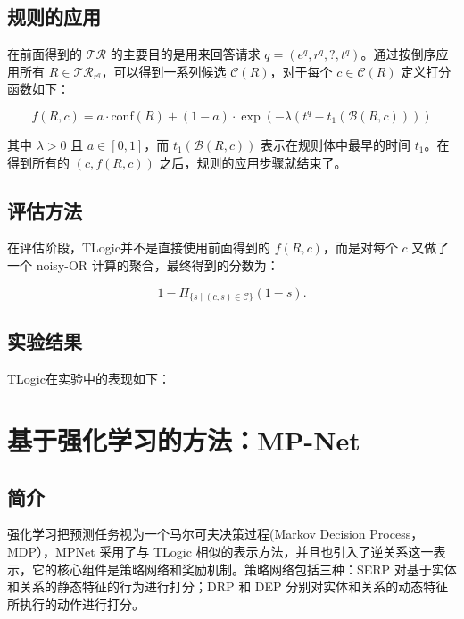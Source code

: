 \documentclass[a4paper, AutoFakeBold]{article}
\begin{document}
\subsection{规则的应用}

在前面得到的 $\mathcal{TR}$ 的主要目的是用来回答请求 $q = (e^q, r^q, ?, t^q)$。通过按倒序应用所有 $R\in\mathcal{TR}_{r^q}$，可以得到一系列候选 $\mathcal{C}(R)$，对于每个 $c \in \mathcal{C}(R)$ 定义打分函数如下：


\begin{equation}
	f(R,c) = a \cdot \mathrm{conf}(R) + (1-a) \cdot \exp(-\lambda (t^q - t_1(\mathcal{B}(R,c))))
\end{equation}


其中 $\lambda>0$ 且 $a\in[0,1]$，而 $t_1(\mathcal{B}(R,c))$ 表示在规则体中最早的时间 $t_1$。在得到所有的 $(c, f(R,c))$ 之后，规则的应用步骤就结束了。

\subsection{评估方法}

在评估阶段，TLogic并不是直接使用前面得到的 $f(R,c)$，而是对每个 $c$ 又做了一个 noisy-OR 计算的聚合，最终得到的分数为：


\begin{equation}
	1 - \Pi_{\{s \mid (c, s) \in \mathcal{C}\}} (1 - s).
\end{equation}


\subsection{实验结果}

TLogic在实验中的表现如下：







\section{基于强化学习的方法：MP-Net}

\subsection{简介}

强化学习把预测任务视为一个马尔可夫决策过程(Markov Decision Process，MDP），MPNet 采用了与 TLogic 相似的表示方法，并且也引入了逆关系这一表示，它的核心组件是策略网络和奖励机制。策略网络包括三种：SERP 对基于实体和关系的静态特征的行为进行打分；DRP 和 DEP 分别对实体和关系的动态特征所执行的动作进行打分。
\end{document}
